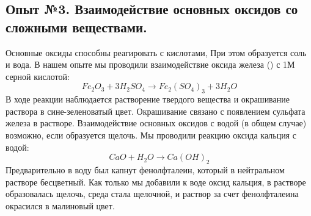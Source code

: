 \documentclass[a4paper, 12pt]{article}
\newcommand{\RomanNumeralCaps}[1]
    {\MakeUppercase{\romannumeral #1}}
\begin{document}
\subsection{Опыт №3. Взаимодействие основных оксидов со сложными веществами.}
Основные оксиды способны реагировать с кислотами, При этом образуется соль и вода. В нашем опыте мы проводили взаимодействие оксида железа (\RomanNumeralCaps{3}) с 1М серной кислотой:
\begin{equation}
    Fe_2 O_3 + 3H_2 SO_4 \xrightarrow{} Fe_2 (SO_4 )_3 + 3H_2 O
\end{equation}
В ходе реакции наблюдается растворение твердого вещества и окрашивание раствора в сине-зеленоватый цвет. Окрашивание связано с появлением сульфата железа в растворе. \newline
Взаимодействие основных оксидов с водой (в общем случае) возможно, если образуется щелочь. Мы проводили реакцию оксида кальция с водой:
\begin{equation}
    CaO + H_2 O \xrightarrow{} Ca(OH)_2
\end{equation}
Предварительно в воду был капнут фенолфталеин, который в нейтральном растворе бесцветный. Как только мы добавили к воде оксид кальция, в растворе образовалась щелочь, среда стала щелочной, и раствор за счет фенолфталеина окрасился в малиновый цвет.
\end{document}
